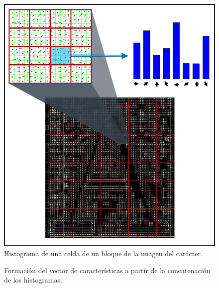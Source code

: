 		\begin{figure}[htbp]
			\centering
			\centerline{ \includegraphics[scale=0.5]{img/letter_A_histogram.jpg} }
			\caption[Histograma de una celda]{Histograma de una celda de un bloque de la imagen del carácter.}
			\label{fig: Histograma de Celda}
		\end{figure}
		
		\begin{figure}[htbp]
			\centering
			\caption[Vector HOG]{Formación del vector de características a partir de la concatenación de los histogramas.}
			\label{fig: Vector HOG}
		\end{figure}
